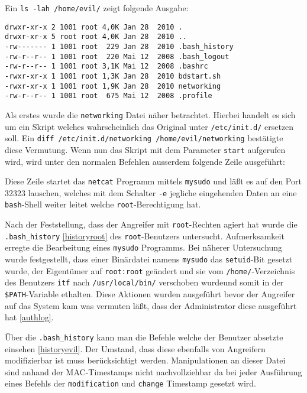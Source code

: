 Ein \texttt{ls -lah /home/evil/} zeigt folgende Ausgabe:
\begin{verbatim}
drwxr-xr-x 2 1001 root 4,0K Jan 28  2010 . 
drwxr-xr-x 5 root root 4,0K Jan 28  2010 .. 
-rw------- 1 1001 root  229 Jan 28  2010 .bash_history 
-rw-r--r-- 1 1001 root  220 Mai 12  2008 .bash_logout 
-rw-r--r-- 1 1001 root 3,1K Mai 12  2008 .bashrc 
-rwxr-xr-x 1 1001 root 1,3K Jan 28  2010 bdstart.sh 
-rwxr-xr-x 1 1001 root 1,9K Jan 28  2010 networking 
-rw-r--r-- 1 1001 root  675 Mai 12  2008 .profile
\end{verbatim}
\pagebreak
Als erstes wurde die \texttt{networking} Datei näher betrachtet. Hierbei handelt es sich um ein Skript welches wahrscheinlich das Original unter \texttt{/etc/init.d/} ersetzen soll. Ein \texttt{diff /etc/init.d/networking /home/evil/networking} bestätigte diese Vermutung. Wenn nun das Skript mit dem Parameter \texttt{start} aufgerufen wird, wird unter den normalen Befehlen ausserdem folgende Zeile ausgeführt:
\lstset{basicstyle=\footnotesize, breaklines=true, breakatwhitespace=true}

Diese Zeile startet das \texttt{netcat} Programm mittels \texttt{mysudo} und läßt es auf den Port 32323 lauschen, welches mit dem Schalter \texttt{-e} jegliche eingehenden Daten an eine \texttt{bash}-Shell weiter leitet welche \texttt{root}-Berechtigung hat.

Nach der Feststellung, dass der Angreifer mit \texttt{root}-Rechten agiert hat wurde die \texttt{.bash\_history} \ref{historyroot} des \texttt{root}-Benutzers untersucht.
Aufmerksamkeit erregte die Bearbeitung eines \texttt{mysudo} Programms.
Bei näherer Untersuchung wurde festgestellt, dass einer Binärdatei namens \texttt{mysudo} das \texttt{setuid}-Bit gesetzt wurde, der Eigentümer auf \texttt{root:root} geändert und sie vom \texttt{/home/}-Verzeichnis des Benutzers \texttt{itf} nach \texttt{/usr/local/bin/} verschoben wurdeund somit in der \texttt{\$PATH}-Variable ethalten. Diese Aktionen wurden ausgeführt bevor der Angreifer auf das System kam was vermuten läßt, dass der Administrator diese ausgeführt hat  \ref{authlog}.

Über die \texttt{.bash\_history} kann man die Befehle welche der Benutzer absetzte einsehen \ref{historyevil}. 
Der Umstand, dass diese ebenfalls von Angreifern modifizierbar ist muss berücksichtigt werden. Manipulationen an dieser Datei sind anhand der MAC-Timestamps nicht nachvollziehbar da bei jeder Ausführung eines Befehls der \texttt{modification} und \texttt{change} Timestamp gesetzt wird.\\